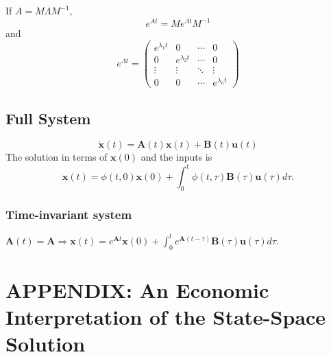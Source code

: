 \begin{remark*} If $A = M \Lambda M ^{-1}$,
    \[
        e ^{At} = M e ^{\Lambda t}M ^{-1}
    \] and \[
        e ^{\Lambda t} = \begin{pmatrix}
            e ^{\lambda_1 t} & 0                & \cdots & 0                \\
            0                & e ^{\lambda_2 t} & \cdots & 0                \\
            \vdots           & \vdots           & \ddots & \vdots           \\
            0                & 0                & \cdots       & e ^{\lambda_n t}
        \end{pmatrix}
    \]
\end{remark*}

\subsection{Full System}
\[
    \dot{\mathbf{x}} (t) = \mathbf{A}(t)\mathbf{x}(t) + \mathbf{B}(t)\mathbf{u}(t)
\]
The solution in terms of \(\mathbf{x}(0)\) and
the inputs is
\[
    \mathbf{x}(t) = \phi (t,0)\mathbf{x}(0) + \int_{0}^{t}\phi (t,\tau)\mathbf{B}(\tau)\mathbf{u}(\tau)d\tau .
\]

\subsubsection{Time-invariant system} $\mathbf{A}(t) = \mathbf{A} \Longrightarrow \mathbf{x}(t) = e^{\mathbf{A}t}\mathbf{x}(0) + \int_{0}^{t}e^{\mathbf{A}(t - \tau)}\mathbf{B}(\tau)\mathbf{u}(\tau)d\tau$.



\section{APPENDIX: An Economic Interpretation of the State-Space Solution}

